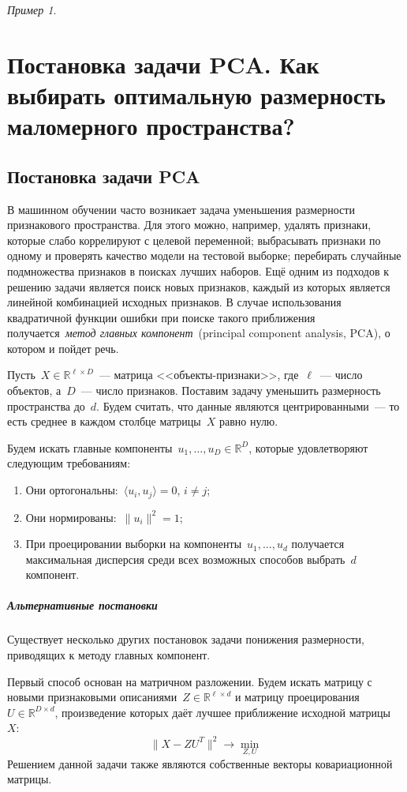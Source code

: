 \documentclass[a4paper, 12pt]{article}
\theoremstyle{plain} %
\theoremstyle{definition} %
\theoremstyle{remark} %
\newtheorem{example}{Пример}
\begin{document}
\begin{example}
\section{Постановка задачи PCA. Как выбирать оптимальную размерность маломерного пространства?}

\subsection{Постановка задачи PCA}

В машинном обучении часто возникает задача уменьшения размерности
признакового пространства.
Для этого можно, например, удалять признаки, которые слабо коррелируют с целевой переменной;
выбрасывать признаки по одному и проверять качество модели на тестовой выборке;
перебирать случайные подмножества признаков в поисках лучших наборов.
Ещё одним из подходов к решению задачи является поиск новых признаков,
каждый из которых является линейной комбинацией исходных признаков.
В случае использования квадратичной функции ошибки при поиске
такого приближения получается~\emph{метод главных компонент}~(principal
component analysis, PCA),
о котором и пойдет речь.

Пусть~$X \in \mathbb{R}^{\ell \times D}$~--- матрица <<объекты-признаки>>,
где~$\ell$~--- число объектов, а~$D$~--- число признаков.
Поставим задачу уменьшить размерность пространства до~$d$.
Будем считать, что данные являются центрированными~--- то есть среднее
в каждом столбце матрицы~$X$ равно нулю.

Будем искать главные компоненты~$u_1, \dots, u_D \in \mathbb{R}^D$, которые удовлетворяют
следующим требованиям:
\begin{enumerate}
    \item Они ортогональны:~$\langle u_i, u_j \rangle = 0$, $i \neq j$;
    \item Они нормированы:~$\|u_i\|^2 = 1$;
    \item При проецировании выборки на компоненты~$u_1, \dots, u_d$ получается
        максимальная дисперсия среди всех возможных способов выбрать~$d$ компонент.
\end{enumerate}

\subparagraph{Альтернативные постановки}

Существует несколько других постановок задачи понижения размерности,
приводящих к методу главных компонент.

Первый способ основан на матричном разложении.
Будем искать матрицу с новыми признаковыми описаниями~$Z \in \mathbb{R}^{\ell \times d}$
и матрицу проецирования~$U \in \mathbb{R}^{D \times d}$,
произведение которых даёт лучшее приближение исходной матрицы~$X$:
\[
    \| X - Z U^T \|^2
    \to
    \min_{Z, U}
\]
Решением данной задачи также являются собственные векторы ковариационной матрицы.


\end{example}
\end{document}
